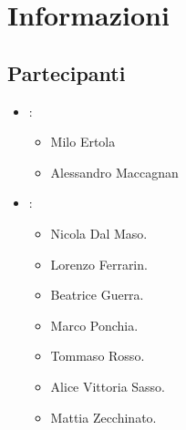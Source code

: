 \section{Informazioni}
\subsection{Partecipanti}

\begin{itemize}
	\item \Proponente:
	\begin{itemize}
		\item Milo Ertola
		\item Alessandro Maccagnan 
	\end{itemize}
	\item \GroupName:
	\begin{itemize}
		\item Nicola Dal Maso.
		\item Lorenzo Ferrarin.
		\item Beatrice Guerra.
		\item Marco Ponchia.
		\item Tommaso Rosso.
		\item Alice Vittoria Sasso.
		\item Mattia Zecchinato.
	\end{itemize}
\end{itemize}

\clearpage
